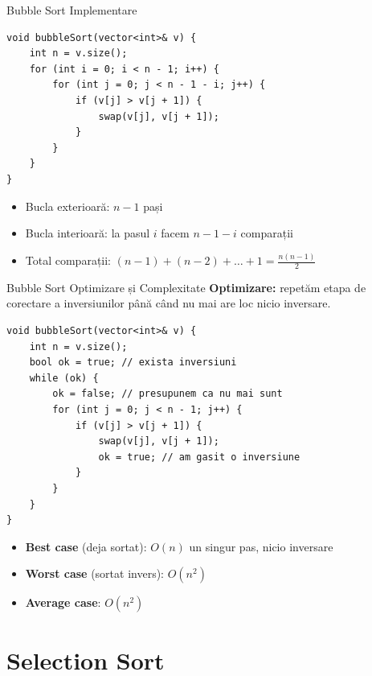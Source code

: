 \documentclass{beamer}
\begin{document}
\begin{frame}[fragile]{Bubble Sort \textemdash{} Implementare}
  \begin{lstlisting}
void bubbleSort(vector<int>& v) {
    int n = v.size();
    for (int i = 0; i < n - 1; i++) {
        for (int j = 0; j < n - 1 - i; j++) {
            if (v[j] > v[j + 1]) {
                swap(v[j], v[j + 1]);
            }
        }
    }
}
  \end{lstlisting}
  \begin{itemize}
    \item Bucla exterioară: $n-1$ pași
    \item Bucla interioară: la pasul $i$ facem $n-1-i$ comparații
    \item Total comparații: $(n-1) + (n-2) + \ldots + 1 = \frac{n(n-1)}{2}$
  \end{itemize}
\end{frame}

\begin{frame}{Bubble Sort \textemdash{} Optimizare și Complexitate}
  \textbf{Optimizare:} repetăm etapa de corectare a inversiunilor până când nu mai are loc nicio inversare.
  \begin{lstlisting}
void bubbleSort(vector<int>& v) {
    int n = v.size();
    bool ok = true; // exista inversiuni
    while (ok) {
        ok = false; // presupunem ca nu mai sunt
        for (int j = 0; j < n - 1; j++) {
            if (v[j] > v[j + 1]) {
                swap(v[j], v[j + 1]);
                ok = true; // am gasit o inversiune
            }
        }
    }
}
  \end{lstlisting}
  \begin{itemize}
    \item \textbf{Best case} (deja sortat): $O(n)$ \textemdash{} un singur pas, nicio inversare
    \item \textbf{Worst case} (sortat invers): $O(n^2)$
    \item \textbf{Average case}: $O(n^2)$
  \end{itemize}
\end{frame}

\section{Selection Sort}
\end{document}
